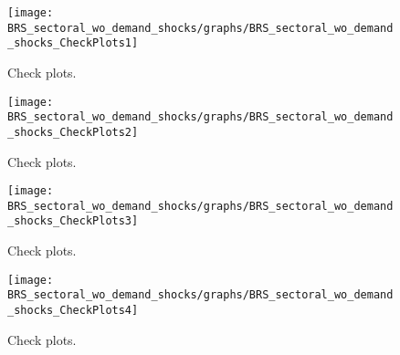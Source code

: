  
\begin{figure}[H]
\centering 
\texttt{[image: BRS\_sectoral\_wo\_demand\_shocks/graphs/BRS\_sectoral\_wo\_demand\_shocks\_CheckPlots1]}
\caption{Check plots.}\label{Fig:CheckPlots:1}
\end{figure}
 
\begin{figure}[H]
\centering 
\texttt{[image: BRS\_sectoral\_wo\_demand\_shocks/graphs/BRS\_sectoral\_wo\_demand\_shocks\_CheckPlots2]}
\caption{Check plots.}\label{Fig:CheckPlots:2}
\end{figure}
 
\begin{figure}[H]
\centering 
\texttt{[image: BRS\_sectoral\_wo\_demand\_shocks/graphs/BRS\_sectoral\_wo\_demand\_shocks\_CheckPlots3]}
\caption{Check plots.}\label{Fig:CheckPlots:3}
\end{figure}
 
\begin{figure}[H]
\centering 
\texttt{[image: BRS\_sectoral\_wo\_demand\_shocks/graphs/BRS\_sectoral\_wo\_demand\_shocks\_CheckPlots4]}
\caption{Check plots.}\label{Fig:CheckPlots:4}
\end{figure}
 
